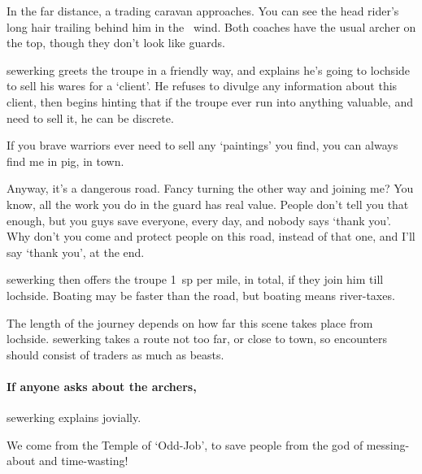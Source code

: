 \begin{boxtext}
  In the far distance, a trading caravan approaches.
  You can see the head rider's long hair trailing behind him in the \showTemperature\ wind.
  Both coaches have the usual archer on the top, though they don't look like \glspl{guard}.
\end{boxtext}

\Gls{sewerking} greets the troupe in a friendly way, and explains he's going to \gls{lochside} to sell his wares for a `client'.
He refuses to divulge any information about this client, then begins hinting that if the troupe ever run into anything valuable, and need to sell it, he can be discrete.

\setcounter{wounds}{2}

\sewerking


\null
\begin{speechtext}
  If you brave warriors ever need to sell any `paintings' you find, you can always find me in \gls{pig}, in \gls{town}.

  Anyway, it's a dangerous road.
  Fancy turning the other way and joining me?
  You know, all the work you do in the \gls{guard} has real value.
  People don't tell you that enough, but you guys save everyone, every day, and nobody says `thank you'.
  Why don't you come and protect people on this road, instead of that one, and I'll say `thank you', at the end.
\end{speechtext}

\Gls{sewerking} then offers the troupe 1~\gls{sp} per mile, in total, if they join him till \gls{lochside}.
Boating may be faster than the road, but boating means river-taxes.

The length of the journey depends on how far this scene takes place from \gls{lochside}.
\Gls{sewerking} takes a route not too far, or close to town, so encounters should consist of traders as much as beasts.

\paragraph{If anyone asks about the archers,}
\gls{sewerking} explains jovially.

\null
\begin{speechtext}
  We come from the Temple of `Odd-Job', to save people from the god of messing-about and time-wasting!
\end{speechtext}

